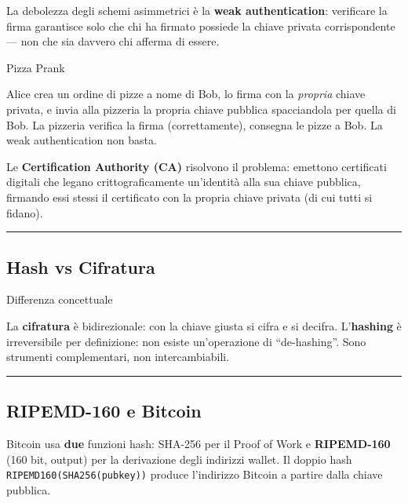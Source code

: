 \documentclass[
  italian,
  openany]{book}
\begin{document}
La debolezza degli schemi asimmetrici è la \textbf{weak authentication}:
verificare la firma garantisce solo che chi ha firmato possiede la
chiave privata corrispondente --- non che sia davvero chi afferma di
essere.

\begin{callouttip}{Pizza Prank}

Alice crea un ordine di pizze a nome di Bob, lo firma con la
\emph{propria} chiave privata, e invia alla pizzeria la propria chiave
pubblica spacciandola per quella di Bob. La pizzeria verifica la firma
(correttamente), consegna le pizze a Bob. La weak authentication non
basta.

\end{callouttip}

Le \textbf{Certification Authority (CA)} risolvono il problema: emettono
certificati digitali che legano crittograficamente un'identità alla sua
chiave pubblica, firmando essi stessi il certificato con la propria
chiave privata (di cui tutti si fidano).

\begin{center}\rule{0.5\linewidth}{0.5pt}\end{center}

\subsection{Hash vs Cifratura}\label{hash-vs-cifratura}

\begin{calloutnote}{Differenza concettuale}

La \textbf{cifratura} è bidirezionale: con la chiave giusta si cifra e
si decifra. L'\textbf{hashing} è irreversibile per definizione: non
esiste un'operazione di ``de-hashing''. Sono strumenti complementari,
non intercambiabili.

\end{calloutnote}

\begin{center}\rule{0.5\linewidth}{0.5pt}\end{center}

\subsection{RIPEMD-160 e Bitcoin}\label{ripemd-160-e-bitcoin}

Bitcoin usa \textbf{due} funzioni hash: SHA-256 per il Proof of Work e
\textbf{RIPEMD-160} (160 bit, output) per la derivazione degli indirizzi
wallet. Il doppio hash \texttt{RIPEMD160(SHA256(pubkey))} produce
l'indirizzo Bitcoin a partire dalla chiave pubblica.
\end{document}
